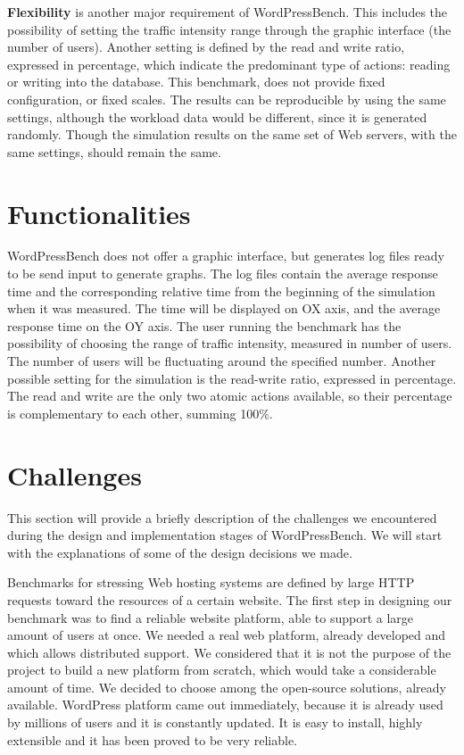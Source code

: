 \textbf{Flexibility} is another major requirement of WordPressBench. This includes the possibility of setting the traffic intensity range through the graphic interface (the number of users). Another setting is defined by the read and write ratio, expressed in percentage, which indicate the predominant type of actions: reading or writing into the database. This benchmark, does not provide fixed configuration, or fixed scales. The results can be reproducible by using the same settings, although the workload data would be different, since it is generated randomly. Though the simulation results on the same set of Web servers, with the same settings, should remain the same.

\section{Functionalities}
\label{sec:functionalities}

WordPressBench does not offer a graphic interface, but generates log files ready to be send input to generate graphs. The log files contain the average response time and the corresponding relative time from the beginning of the simulation when it was measured. The time will be displayed on OX axis, and the average response time on the OY axis.
The user running the benchmark has the possibility of choosing the range of  traffic intensity, measured in number of users. The number of users will be fluctuating around the specified number. Another possible setting for the simulation is the read-write ratio, expressed in percentage. The read and write are the only two atomic actions available, so their percentage is complementary to each other, summing 100\%.

\section{Challenges}
\label{sec:challenges}

This section will provide a briefly description of the challenges we encountered during the design and implementation stages of WordPressBench. We will start with the explanations of some of the design decisions we made.

Benchmarks for stressing Web hosting systems are defined by large HTTP requests toward the resources of a certain website. The first step in designing our benchmark was to find a reliable website platform, able to support a large amount of users at once. We needed a real web platform, already developed and which allows distributed support. We considered that it is not the purpose of the project to build a new platform from scratch, which would take a considerable amount of time. We decided to choose among the open-source solutions, already available. WordPress platform came out immediately, because it is already used by millions of users and it is constantly updated. It is easy to install, highly extensible and it has been proved to be very reliable.

